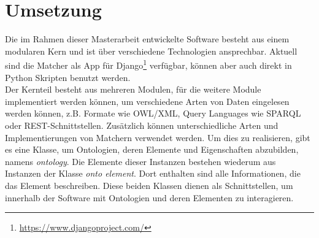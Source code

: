 		\section{Umsetzung}
		Die im Rahmen dieser Masterarbeit entwickelte Software besteht aus einem
		modularen Kern und ist über verschiedene Technologien ansprechbar. Aktuell
		sind die Matcher als App
		für Django\footnote{\url{https://www.djangoproject.com/}} verfügbar, können
		aber auch direkt in Python Skripten benutzt werden.\\
		Der Kernteil besteht aus mehreren Modulen, für die weitere Module
		implementiert werden können, um verschiedene Arten von Daten eingelesen
		werden können, z.B.
		Formate wie OWL/XML, Query Languages wie SPARQL oder REST-Schnittstellen.
		Zusätzlich können unterschiedliche Arten und Implementierungen von Matchern
		verwendet werden. Um dies zu realisieren, gibt es eine Klasse, um Ontologien,
		deren Elemente und Eigenschaften abzubilden, namens \textit{ontology}.
		Die Elemente dieser Instanzen bestehen wiederum aus Instanzen der Klasse
		\textit{onto element}. Dort enthalten sind alle Informationen, die das Element
		beschreiben. Diese beiden Klassen dienen als Schnittstellen, um innerhalb der
		Software mit Ontologien und deren Elementen zu interagieren.
		

